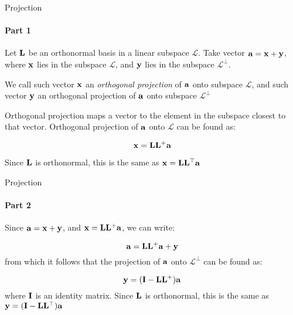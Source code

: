 \documentclass{beamer}
\begin{document}
\begin{frame}{Projection}
	\framesubtitle{Part 1}
	\begin{flushleft}
		
		Let $\mathbf{L}$ be an orthonormal basis in a linear subspace $\mathcal{L}$. Take vector $\mathbf{a} = \mathbf{x} + \mathbf{y}$, where $\mathbf{x}$ lies in the subspace $\mathcal{L}$, and $\mathbf{y}$ lies in the subspace $\mathcal{L}^\perp$.
		
		\bigskip
		
		\begin{definition}
			We call such vector $\mathbf{x}$ an \emph{orthogonal projection} of $\mathbf{a}$ onto subspace $\mathcal{L}$, and such vector $\mathbf{y}$ an orthogonal projection of $\mathbf{a}$ onto subspace $\mathcal{L}^\perp$
		\end{definition}
		
		\bigskip
		
		Orthogonal projection maps a vector to the element in the subspace closest to that vector. Orthogonal projection of $\mathbf{a}$ onto $\mathcal{L}$ can be found as: 
		
		\begin{equation}
			\mathbf{x} = \mathbf{L} \mathbf{L}^+ \mathbf{a}
		\end{equation}
		
		Since $\mathbf{L}$ is orthonormal, this is the same as $\mathbf{x} = \mathbf{L} \mathbf{L}^\top \mathbf{a}$
		
	\end{flushleft}
\end{frame}



\begin{frame}{Projection}
	\framesubtitle{Part 2}
	\begin{flushleft}
		
		Since $\mathbf{a} = \mathbf{x} + \mathbf{y}$, and $\mathbf{x} = \mathbf{L} \mathbf{L}^+ \mathbf{a}$, we can write:
		
		\begin{equation}
			\mathbf{a} = \mathbf{L} \mathbf{L}^+ \mathbf{a} + \mathbf{y}
		\end{equation}
		from which it follows that the projection of $\mathbf{a}$ onto $\mathcal{L}^\perp$ can be found as: 
		
		\begin{equation}
			\mathbf{y} = (\mathbf{I} - \mathbf{L} \mathbf{L}^+) \mathbf{a}
		\end{equation}
		where $\mathbf{I}$ is an identity matrix. Since $\mathbf{L}$ is orthonormal, this is the same as $\mathbf{y} = (\mathbf{I} - \mathbf{L} \mathbf{L}^\top) \mathbf{a}$
		
	\end{flushleft}
\end{frame}
\end{document}
